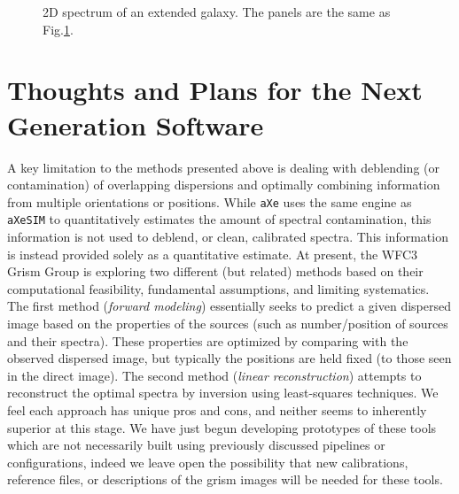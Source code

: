 \documentclass[preprint]{aastex}
\begin{document}
\begin{figure}
    \caption{2D spectrum of an extended galaxy.  The panels are the same as Fig.\ref{fig:gal2D}.}
    \label{fig:gal2D}
\end{figure}




\section{Thoughts and Plans for the Next Generation Software}\label{sec:nextgen} 

A key limitation to the methods presented above is dealing with deblending (or contamination) of overlapping dispersions and optimally combining information from multiple orientations or positions.  
While \texttt{aXe} uses the same engine as \texttt{aXeSIM} to quantitatively estimates the amount of spectral contamination, this information is not used to deblend, or clean, calibrated spectra. This information is instead provided solely as a quantitative estimate. At present, the WFC3 Grism Group is exploring two different (but related) methods based on their computational feasibility, fundamental assumptions, and limiting systematics.  The first method ({\it forward modeling}) essentially seeks to predict a given dispersed image based on the properties of the sources (such as number/position of sources and their spectra).  These properties are optimized by comparing with the observed dispersed image, but typically the positions are held fixed (to those seen in the direct image).  The second method ({\it linear reconstruction}) attempts to reconstruct the optimal spectra by inversion using least-squares techniques.  We feel each approach has unique pros and cons, and neither seems to inherently superior at this stage.  We have just begun developing prototypes of these tools which are not necessarily built using previously discussed pipelines or configurations, indeed we leave open the possibility that new calibrations, reference files, or descriptions of the grism images will be needed for these tools.  
\end{document}
